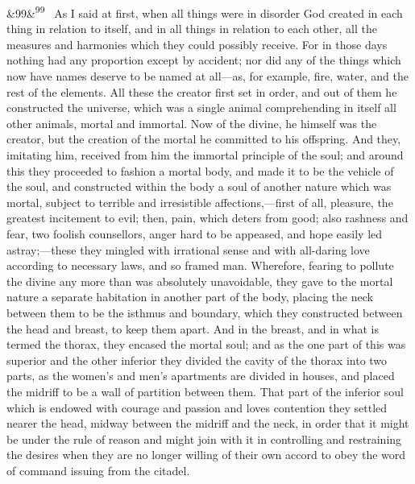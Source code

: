 \documentclass[12pt]{article}
\newcommand{\para}[1][]{\par\noindent\ifx&#1&\else\textsuperscript{\footnotesize #1}~\fi}
\begin{document}
\para[99] As I said at first, when all things were in disorder God created in each thing in relation to itself, and in all things in relation to each other, all the measures and harmonies which they could possibly receive. For in those days nothing had any proportion except by accident; nor did any of the things which now have names deserve to be named at all---as, for example, fire, water, and the rest of the elements. All these the creator first set in order, and out of them he constructed the universe, which was a single animal comprehending in itself all other animals, mortal and immortal. Now of the divine, he himself was the creator, but the creation of the mortal he committed to his offspring. And they, imitating him, received from him the immortal principle of the soul; and around this they proceeded to fashion a mortal body, and made it to be the vehicle of the soul, and constructed within the body a soul of another nature which was mortal, subject to terrible and irresistible affections,---first of all, pleasure, the greatest incitement to evil; then, pain, which deters from good; also rashness and fear, two foolish counsellors, anger hard to be appeased, and hope easily led astray;---these they mingled with irrational sense and with all-daring love according to necessary laws, and so framed man. Wherefore, fearing to pollute the divine any more than was absolutely unavoidable, they gave to the mortal nature a separate habitation in another part of the body, placing the neck between them to be the isthmus and boundary, which they constructed between the head and breast, to keep them apart. And in the breast, and in what is termed the thorax, they encased the mortal soul; and as the one part of this was superior and the other inferior they divided the cavity of the thorax into two parts, as the women's and men's apartments are divided in houses, and placed the midriff to be a wall of partition between them. That part of the inferior soul which is endowed with courage and passion and loves contention they settled nearer the head, midway between the midriff and the neck, in order that it might be under the rule of reason and might join with it in controlling and restraining the desires when they are no longer willing of their own accord to obey the word of command issuing from the citadel.
\end{document}
